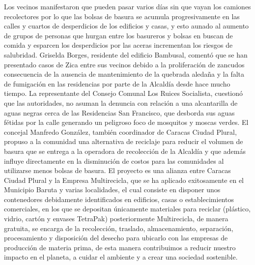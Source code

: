 \documentclass{article}%
\begin{document}
\newline%
%
Los vecinos manifestaron que pueden pasar varios días sin que vayan los camiones recolectores  por lo que las bolsas de basura se acumula progresivamente en las calles y cuartos de desperdicios de los edificios y casas, y esto aunado al aumento de grupos de personas que hurgan entre los basureros y bolsas en buscan de comida y esparcen los desperdicios por las aceras incrementan los riesgos de salubridad.%
\newline%
%
Griselda Borges, residente del edificio Bambusal, comentó que se han presentado casos de Zica entre sus vecinos debido a la proliferación de zancudos consecuencia de la ausencia de mantenimiento de la quebrada aledaña y la falta de fumigación en las residencias por parte de la Alcaldía desde hace mucho tiempo.%
\newline%
%
La representante del Consejo Comunal Los Ruices Socialista, cuestionó que las autoridades, no asuman la denuncia con relación a una alcantarilla de aguas negras  cerca de las Residencias San Francisco, que desborda sus aguas fétidas por la calle generando un peligroso foco de mosquitos y moscas verdes.%
\newline%
%
El concejal Manfredo González, también coordinador de Caracas Ciudad Plural, propuso a la comunidad una alternativa de reciclaje para reducir el volumen de basura que se entrega a la operadora de recolección de la Alcaldía y que además influye directamente en la disminución de costos para las comunidades al utilizarse menos bolsas de basura.%
\newline%
%
El proyecto es una alianza entre Caracas Ciudad Plural y la Empresa Multirecicla, que se ha aplicado exitosamente en el Municipio Baruta y varias localidades, el cual consiste en disponer unos contenedores debidamente identificados en edificios, casas o establecimientos comerciales, en los que se depositan únicamente materiales para reciclar (plástico, vidrio, cartón y envases TetraPak) posteriormente Multirecicla, de manera gratuita, se encarga de la recolección, traslado, almacenamiento, separación, procesamiento y disposición del desecho para ubicarlo con las empresas de producción de materia prima, de esta manera contribuimos a reducir nuestro impacto en el planeta, a cuidar el ambiente y a crear una sociedad sostenible.%
\newline%
%
\end{document}
